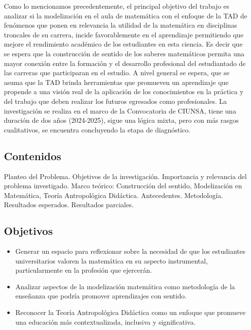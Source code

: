 Como lo mencionamos precedentemente, el principal objetivo del trabajo es analizar si la modelización en el aula de matemática con el enfoque de la TAD de fenómenos que ponen en relevancia la utilidad de la matemática en disciplinas troncales de su carrera, incide favorablemente en el aprendizaje permitiendo que mejore el rendimiento académico de los estudiantes en esta ciencia. Es decir que se espera que la construcción de sentido de los saberes matemáticos permita una mayor conexión entre la formación y el desarrollo profesional del estudiantado de las carreras que participaran en el estudio. A nivel general se espera, que se asuma que la TAD brinda herramientas que promueven un aprendizaje que propende a una visión real de la aplicación de los conocimientos en la práctica y del trabajo que deben realizar los futuros egresados como profesionales. La investigación se realiza en el marco de la Convocatoria de CIUNSA, tiene una duración de dos años (2024-2025), sigue una lógica mixta, pero con más rasgos cualitativos, se encuentra concluyendo la etapa de diagnóstico.

\subsection{Contenidos}

Planteo del Problema. Objetivos de la investigación. Importancia y relevancia del problema investigado. Marco teórico: Construcción del sentido, Modelización en Matemática, Teoría Antropológica Didáctica. Antecedentes. Metodología. Resultados esperados. Resultados parciales.

\subsection{Objetivos}

\begin{itemize}
	\item Generar un espacio para reflexionar sobre la necesidad de que los estudiantes universitarios valoren la matemática en su aspecto instrumental, particularmente en la profesión que ejercerán.
	\item Analizar aspectos de la modelización matemática como metodología de la enseñanza que podría promover aprendizajes con sentido.
	\item Reconocer la Teoría Antropológica Didáctica como un enfoque que promueve una educación más contextualizada, inclusiva y significativa.
\end{itemize}

